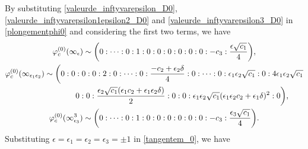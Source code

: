 \documentclass[10pt,a4paper]{amsart}
\numberwithin{equation}{section}
\begin{document}
By substituting \eqref{valeurde_inftyvarepsilon_D0},
\eqref{valeurde_inftyvarepsilon1epsilon2_D0} and
\eqref{valeurde_inftyvarepsilon3_D0} in \eqref{plongementphi0} and
considering the first two terms, we have
\begin{gather}
 \varphi_c^{ (0 )} (\infty_\epsilon ) \sim \biggl(0: \dots: 0: 1: 0: 0: 0: 0: 0: 0:- c_3:\frac{\epsilon \sqrt{c_1}}{4} \biggr),\nonumber\\
 \varphi_c^{ (0 )} (\infty_{\epsilon_1\epsilon_2} ) \sim \biggl(0:0:0:0:2:0:\cdots:0: \frac{-c_2+\epsilon_2\delta}{4}:0:\cdots:0: \epsilon_1\epsilon_2\sqrt{c_1}:0:4\epsilon_1\epsilon_2\sqrt{ c_1} \nonumber\\ \hphantom{\varphi_c^{ (0 )} (\infty_{\epsilon_1\epsilon_2} ) \sim \biggl(}{}
 0:0:\frac{\epsilon_2\sqrt{c_1} (\epsilon_1c_2+\epsilon_1\epsilon_2\delta )}{2}:0:0:\epsilon_1\epsilon_2\sqrt{c_1} (\epsilon_1\epsilon_2c_2+\epsilon_1\delta)^2:0 \biggr) , \nonumber\\
 \varphi_c^{ (0 )} (\infty^3_{\epsilon_3} ) \sim \biggl(0:\dots: 0: 1: 0: 0: 0: 0: 0: 0:-c_3:\frac{\epsilon_3\sqrt{c_1}}{4} \biggr).\label{tangentem_0}
\end{gather}
Substituting $\epsilon=\epsilon_1=\epsilon_2=\epsilon_3=\pm 1$ in
\eqref{tangentem_0}, we have
\end{document}
